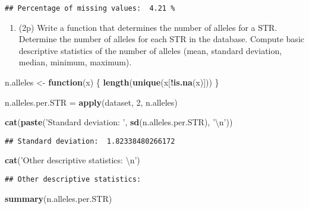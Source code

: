 \documentclass[
]{article}
\newenvironment{Shaded}{\begin{snugshade}}{\end{snugshade}}
\newcommand{\CharTok}[1]{\textcolor[rgb]{0.31,0.60,0.02}{#1}}
\newcommand{\ControlFlowTok}[1]{\textcolor[rgb]{0.13,0.29,0.53}{\textbf{#1}}}
\newcommand{\DecValTok}[1]{\textcolor[rgb]{0.00,0.00,0.81}{#1}}
\newcommand{\KeywordTok}[1]{\textcolor[rgb]{0.13,0.29,0.53}{\textbf{#1}}}
\newcommand{\NormalTok}[1]{#1}
\newcommand{\OperatorTok}[1]{\textcolor[rgb]{0.81,0.36,0.00}{\textbf{#1}}}
\newcommand{\StringTok}[1]{\textcolor[rgb]{0.31,0.60,0.02}{#1}}
\providecommand{\tightlist}{%
  \setlength{\itemsep}{0pt}\setlength{\parskip}{0pt}}
\begin{document}
\begin{verbatim}
## Percentage of missing values:  4.21 %
\end{verbatim}

\begin{enumerate}
\def\labelenumi{\arabic{enumi}.}
\setcounter{enumi}{3}
\tightlist
\item
  (2p) Write a function that determines the number of alleles for a STR.
  Determine the number of alleles for each STR in the database. Compute
  basic descriptive statistics of the number of alleles (mean, standard
  deviation, median, minimum, maximum).
\end{enumerate}

\begin{Shaded}
\begin{Highlighting}[]
\NormalTok{n.alleles <-}\StringTok{ }\ControlFlowTok{function}\NormalTok{(x) \{}
  \KeywordTok{length}\NormalTok{(}\KeywordTok{unique}\NormalTok{(x[}\OperatorTok{!}\KeywordTok{is.na}\NormalTok{(x)]))}
\NormalTok{\}}

\NormalTok{n.alleles.per.STR =}\StringTok{ }\KeywordTok{apply}\NormalTok{(dataset, }\DecValTok{2}\NormalTok{, n.alleles)}

\KeywordTok{cat}\NormalTok{(}\KeywordTok{paste}\NormalTok{(}\StringTok{'Standard deviation: '}\NormalTok{, }\KeywordTok{sd}\NormalTok{(n.alleles.per.STR), }\StringTok{'}\CharTok{\textbackslash{}n}\StringTok{'}\NormalTok{))}
\end{Highlighting}
\end{Shaded}

\begin{verbatim}
## Standard deviation:  1.82338480266172
\end{verbatim}

\begin{Shaded}
\begin{Highlighting}[]
\KeywordTok{cat}\NormalTok{(}\StringTok{'Other descriptive statistics: }\CharTok{\textbackslash{}n}\StringTok{'}\NormalTok{)}
\end{Highlighting}
\end{Shaded}

\begin{verbatim}
## Other descriptive statistics:
\end{verbatim}

\begin{Shaded}
\begin{Highlighting}[]
\KeywordTok{summary}\NormalTok{(n.alleles.per.STR)}
\end{Highlighting}
\end{Shaded}
\end{document}
